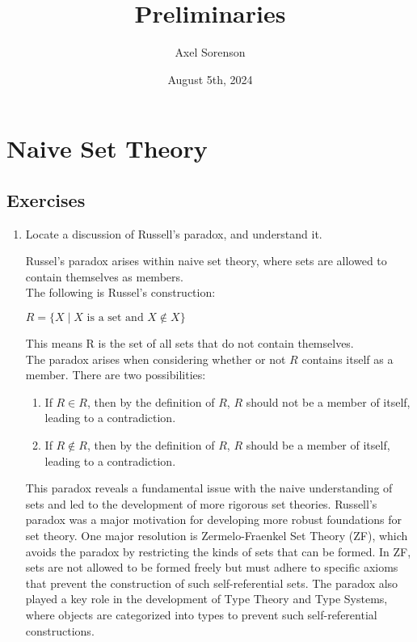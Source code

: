 \documentclass{article}
\title{Preliminaries}
\author{Axel Sorenson}
\date{August 5th, 2024}
\begin{document}
\maketitle

\section{Naive Set Theory}
\subsection{Exercises}
\begin{enumerate}
\item Locate a discussion of Russell's paradox, and understand it.
\bigskip

Russel's paradox arises within naive set theory, where sets are allowed to contain themselves as members.\\
The following is Russel's construction:
\begin{center}
    $R = \{X \mid X \text{ is a set and } X \notin X\}$
\end{center}
This means R is the set of all sets that do not contain themselves.\\
The paradox arises when considering whether or not $R$ contains itself as a member. There are two possibilities:
\begin{enumerate}
    \item If $R \in R$, then by the definition of $R$, $R$ should not be a member of itself, leading to a contradiction.
    \item If $R \notin R$, then by the definition of $R$, $R$ should be a member of itself, leading to a contradiction.
\end{enumerate}
This paradox reveals a fundamental issue with the naive understanding of sets and led to the development of more rigorous set theories. Russell's paradox was a major motivation for developing more robust foundations for set theory. One major resolution is Zermelo-Fraenkel Set Theory (ZF), which avoids the paradox by restricting the kinds of sets that can be formed. In ZF, sets are not allowed to be formed freely but must adhere to specific axioms that prevent the construction of such self-referential sets. The paradox also played a key role in the development of Type Theory and Type Systems, where objects are categorized into types to prevent such self-referential constructions.


\end{enumerate}
\end{document}
